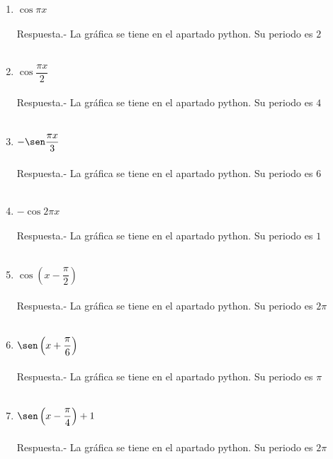 \begin{enumerate}
\item $\cos \pi x$\\\\
    Respuesta.-\; La gráfica se tiene en el apartado python. Su periodo es $2$\\\\

\item $\cos \dfrac{\pi x}{2}$\\\\
    Respuesta.-\; La gráfica se tiene en el apartado python. Su periodo es $4$\\\\

\item $-\sen \dfrac{\pi x}{3}$\\\\
    Respuesta.-\; La gráfica se tiene en el apartado python. Su periodo es $6$\\\\

\item $- \cos 2\pi x$\\\\
    Respuesta.-\; La gráfica se tiene en el apartado python. Su periodo es $1$\\\\

\item $\cos \left(x - \dfrac{\pi}{2}\right)$\\\\
    Respuesta.-\; La gráfica se tiene en el apartado python. Su periodo es $2\pi$\\\\

\item $\sen \left(x+\dfrac{\pi}{6}\right)$\\\\
    Respuesta.-\; La gráfica se tiene en el apartado python. Su periodo es $\pi$\\\\

\item $\sen \left(x-\dfrac{\pi}{4}\right)+1$\\\\
    Respuesta.-\; La gráfica se tiene en el apartado python. Su periodo es $2\pi$\\\\


\end{enumerate}
